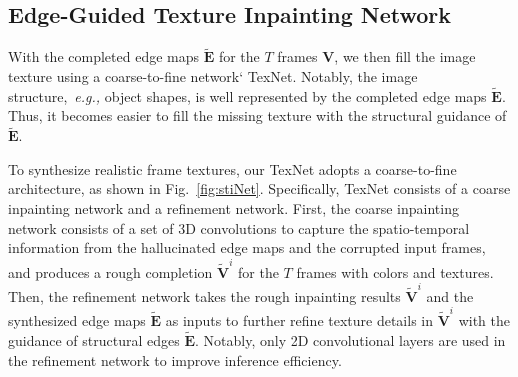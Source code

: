\subsection{Edge-Guided Texture Inpainting Network}


With the completed edge maps $\boldsymbol{\widetilde{E}}$ for the $T$ frames $\boldsymbol{V}$, we then fill the image texture using a coarse-to-fine network` TexNet.
%
Notably, the image structure,~\emph{e.g.,} object shapes, is well represented by the completed edge maps $\boldsymbol{\widetilde{E}}$.
Thus, it becomes easier to fill the missing texture with the structural guidance of $\boldsymbol{\widetilde{E}}$.

To synthesize realistic frame textures, our TexNet adopts a coarse-to-fine architecture, as shown in Fig.~\ref{fig:stiNet}.
Specifically, TexNet consists of a coarse inpainting network and a refinement network.
%
First, the coarse inpainting network consists of a set of 3D convolutions to capture the spatio-temporal information from the hallucinated edge maps and the corrupted input frames, and produces a rough completion $\boldsymbol{\widetilde{V}}^i$ for the $T$ frames with colors and textures.
Then, the refinement network takes the rough inpainting results $\boldsymbol{\widetilde{V}}^i$ and the synthesized edge maps $\boldsymbol{\widetilde{E}}$ as inputs to further refine texture details in $\boldsymbol{\widetilde{V}}^i$ with the guidance of structural edges $\boldsymbol{\widetilde{E}}$.
Notably, only 2D convolutional layers are used in the refinement network to improve inference efficiency. 

